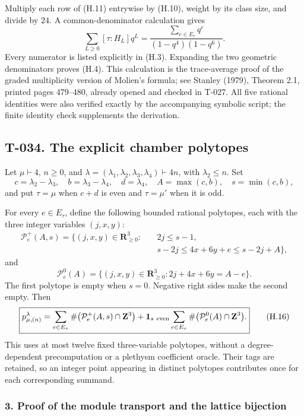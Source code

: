 \documentclass[
  10pt,
]{article}
\begin{document}
Multiply each row of (H.11) entrywise by (H.10), weight by its class
size, and divide by \(24\). A common-denominator calculation gives \[
\sum_{L\ge0}[\tau:H_L]q^L
=\frac{\sum_{e\in E_\tau}q^e}{(1-q^4)(1-q^6)}.
\tag{H.12}
\] Every numerator is listed explicitly in (H.3). Expanding the two
geometric denominators proves (H.4). This calculation is the
trace-average proof of the graded multiplicity version of Molien's
formula; see Stanley (1979), Theorem 2.1, printed pages 479--480,
already opened and checked in T-027. All five rational identities were
also verified exactly by the accompanying symbolic script; the finite
identity check supplements the derivation.

\subsection{T-034. The explicit chamber
polytopes}\label{t-034.-the-explicit-chamber-polytopes}

Let \(\mu\vdash4\), \(n\ge0\), and
\(\lambda=(\lambda_1,\lambda_2,\lambda_3,\lambda_4)\vdash4n\), with
\(\lambda_2\le n\). Set \[
c=\lambda_2-\lambda_3,\quad
b=\lambda_3-\lambda_4,\quad
d=\lambda_4,\quad A=\max(c,b),\quad s=\min(c,b),
\tag{H.13}
\] and put \(\tau=\mu\) when \(c+d\) is even and \(\tau=\mu'\) when it
is odd.

For every \(e\in E_\tau\), define the following bounded rational
polytopes, each with the three integer variables \((j,x,y)\): \[
\begin{aligned}
\mathcal P_e^+(A,s)
=\{(j,x,y)\in\mathbf R_{\ge0}^3:\quad&
2j\le s-1,\\
&s-2j\le4x+6y+e\le s-2j+A\},
\end{aligned}
\tag{H.14}
\] and \[
\mathcal P_e^0(A)=
\{(j,x,y)\in\mathbf R_{\ge0}^3:
2j+4x+6y=A-e\}.
\tag{H.15}
\] The first polytope is empty when \(s=0\). Negative right sides make
the second empty. Then \[
\boxed{
p_{\mu,(n)}^\lambda
=
\sum_{e\in E_\tau}
\#\bigl(\mathcal P_e^+(A,s)\cap\mathbf Z^3\bigr)
+\mathbf1_{s\ {\rm even}}
\sum_{e\in E_\tau}
\#\bigl(\mathcal P_e^0(A)\cap\mathbf Z^3\bigr).}
\tag{H.16}
\] This uses at most twelve fixed three-variable polytopes, without a
degree-dependent precomputation or a plethysm coefficient oracle. Their
tags are retained, so an integer point appearing in distinct polytopes
contributes once for each corresponding summand.

\subsubsection{3. Proof of the module transport and the lattice
bijection}\label{proof-of-the-module-transport-and-the-lattice-bijection}
\end{document}
